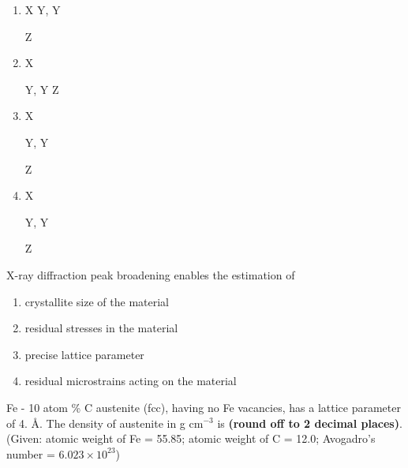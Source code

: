     \begin{enumerate}
        \item X \raisebox{1ex}{\rule{0.5cm}{0.4pt}} Y, Y  Z
        \item X  Y, Y \raisebox{1ex}{\rule{0.5cm}{0.4pt}} Z
        \item X  Y, Y  Z
        \item X  Y, Y  Z
    \end{enumerate}

    \item X-ray diffraction peak broadening enables the estimation of
    \begin{enumerate}
        \item crystallite size of the material
        \item residual stresses in the material
        \item precise lattice parameter
        \item residual microstrains acting on the material
    \end{enumerate}
    \item Fe - 10 atom \% C austenite (fcc), having no Fe vacancies, has a lattice parameter of 4. Å. The density of austenite in g cm$^{-3}$ is \textbf{(round off to 2 decimal places)}. \\
    (Given: atomic weight of Fe = 55.85; atomic weight of C = 12.0; Avogadro's number = $6.023 \times 10^{23}$)

